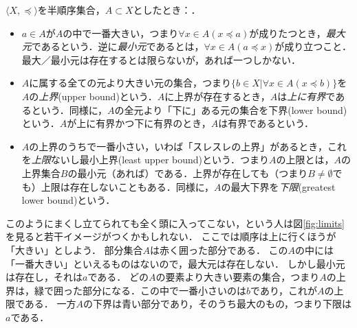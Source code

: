\documentclass[dvipdfmx,11pt,a4paper]{jsarticle}
\begin{document}
$\langle X, \preceq \rangle$を半順序集合，$A \subset X$としたとき：．
\begin{itemize}
  \item $a \in A$が$A$の中で一番大きい，つまり$\forall x \in A (x \preceq a)$が成りたつとき，\emph{最大元}であるという．逆に\emph{最小元}であるとは，$\forall x \in A (a \preceq x)$が成り立つこと．最大／最小元は存在するとは限らないが，あれば一つしかない．
  \item $A$に属する全ての元より大きい元の集合，つまり$\{ b \in X | \forall x \in A (x \preceq b) \}$を$A$の\emph{上界}(upper bound)という．$A$に上界が存在するとき，$A$は\emph{上に有界}であるという．同様に，$A$の全元より「下に」ある元の集合を下界(lower bound)という．$A$が上に有界かつ下に有界のとき，$A$は有界であるという．
  \item $A$の上界のうちで一番小さい，いわば「スレスレの上界」があるとき，これを\emph{上限}ないし最小上界(least upper bound)という．つまり$A$の上限とは，$A$の上界集合$B$の最小元（あれば）である．上界が存在しても（つまり$B \neq \emptyset$でも）上限は存在しないこともある．同様に，$A$の最大下界を\emph{下限}(greatest lower bound)という．
\end{itemize}


  このようにまくし立てられても全く頭に入ってこない，という人は図\ref{fig:limits}を見ると若干イメージがつくかもしれない．
ここでは順序は上に行くほうが「大きい」としよう．
部分集合$A$は赤く囲った部分である．
この$A$の中には「一番大きい」といえるものはないので，最大元は存在しない．
しかし最小元は存在し，それは$a$である．
どの$A$の要素より大きい要素の集合，つまり$A$の上界は，緑で囲った部分になる．この中で一番小さいのは$b$であり，これが$A$の上限である．
一方$A$の下界は青い部分であり，そのうち最大のもの，つまり下限は$a$である．
\end{document}
